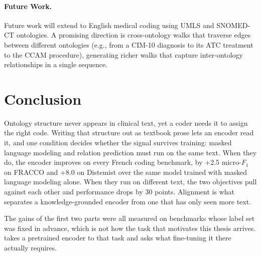 \paragraph{Future Work.}
Future work will extend \method to English medical coding using UMLS and SNOMED-CT ontologies. A promising direction is cross-ontology walks that traverse edges between different ontologies (e.g., from a CIM-10 diagnosis to its ATC treatment to the CCAM procedure), generating richer walks that capture inter-ontology relationships in a single sequence.

\section*{Conclusion}

Ontology structure never appears in clinical text, yet a coder needs it to assign the right code. Writing that structure out as textbook prose lets an encoder read it, and one condition decides whether the signal survives training: masked language modeling and relation prediction must run on the same text. When they do, the encoder improves on every French coding benchmark, by +2.5 micro-$F_1$ on FRACCO and +8.0 on Distemist over the same model trained with masked language modeling alone. When they run on different text, the two objectives pull against each other and performance drops by 30 points. Alignment is what separates a knowledge-grounded encoder from one that has only seen more text.

\vspace{2em}

The gains of the first two parts were all measured on benchmarks whose label set was
fixed in advance, which is not how the task that motivates this thesis arrives.
 takes a pretrained encoder to that task and asks what
fine-tuning it there actually requires.

